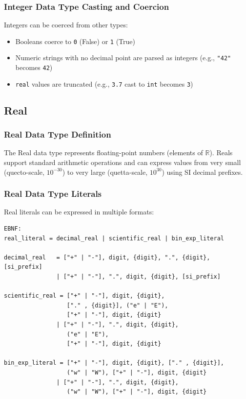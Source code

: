 \subsubsection{Integer Data Type Casting and Coercion}
Integers can be coerced from other types:
\begin{itemize}
\item Booleans coerce to \texttt{0} (False) or \texttt{1} (True)
\item Numeric strings with no decimal point are parsed as integers (e.g., \texttt{"42"} becomes \texttt{42})
\item \texttt{real} values are truncated (e.g., \texttt{3.7} cast to \texttt{int} becomes \texttt{3})
\end{itemize}

\subsection{Real}
\subsubsection{Real Data Type Definition}
The Real data type represents floating-point numbers (elements of $\mathbb{R}$). Reals support standard arithmetic operations and can express values from very small (quecto-scale, $10^{-30}$) to very large (quetta-scale, $10^{30}$) using SI decimal prefixes.
\subsubsection{Real Data Type Literals}
Real literals can be expressed in multiple formats:
\begin{verbatim}
EBNF:
real_literal = decimal_real | scientific_real | bin_exp_literal

decimal_real   = ["+" | "-"], digit, {digit}, ".", {digit}, [si_prefix]
               | ["+" | "-"], ".", digit, {digit}, [si_prefix]

scientific_real = ["+" | "-"], digit, {digit}, 
                  ["." , {digit}], ("e" | "E"), 
                  ["+" | "-"], digit, {digit}
               | ["+" | "-"], ".", digit, {digit}, 
                  ("e" | "E"), 
                  ["+" | "-"], digit, {digit}

bin_exp_literal = ["+" | "-"], digit, {digit}, ["." , {digit}],
                  ("w" | "W"), ["+" | "-"], digit, {digit}
               | ["+" | "-"], ".", digit, {digit},
                  ("w" | "W"), ["+" | "-"], digit, {digit}
\end{verbatim}


